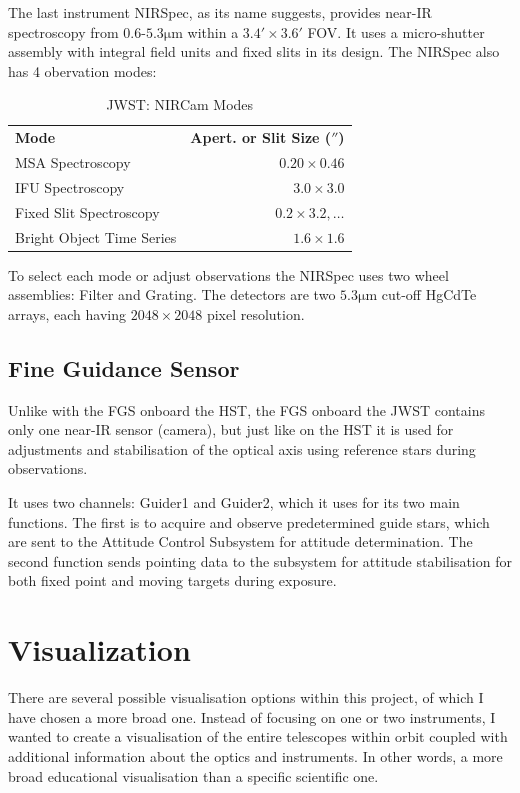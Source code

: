 The last instrument NIRSpec, as its name suggests, provides near-IR spectroscopy from $0.6\text{-}5.3 \unit{\micro\meter}$ within a $3.4' \times 3.6'$ FOV. It uses a micro-shutter assembly with integral field units and fixed slits in its design. The NIRSpec also has 4 obervation modes:

\begin{table}[h]
    \centering
    \begin{tabular}{lr}
        \textbf{Mode} & \textbf{Apert. or Slit Size ($''$)}  \\
        MSA Spectroscopy & $0.20 \times 0.46$ \\
        IFU Spectroscopy & $3.0 \times 3.0$ \\
        Fixed Slit Spectroscopy & $0.2 \times 3.2, \dots$ \\
        Bright Object Time Series   & $1.6 \times 1.6$ \\
    \end{tabular}
    \caption{JWST: NIRCam Modes \cite{JWST_NIRSpec}}
    \label{tab:jwst_ote_information}
\end{table}

To select each mode or adjust observations the NIRSpec uses two wheel assemblies: Filter and Grating. The detectors are two $5.3 \unit{\micro\meter}$ cut-off HgCdTe arrays, each having $2048 \times 2048$ pixel resolution.

\subsection{Fine Guidance Sensor}

Unlike with the FGS onboard the HST, the FGS onboard the JWST contains only one near-IR sensor (camera), but just like on the HST it is used for adjustments and stabilisation of the optical axis using reference stars during observations. 

It uses two channels: Guider1 and Guider2, which it uses for its two main functions. The first is to acquire and observe predetermined guide stars, which are sent to the Attitude Control Subsystem for attitude determination. The second function sends pointing data to the subsystem for attitude stabilisation for both fixed point and moving targets during exposure.

\section{Visualization}

There are several possible visualisation options within this project, of which I have chosen a more broad one. Instead of focusing on one or two instruments, I wanted to create a visualisation of the entire telescopes within orbit coupled with additional information about the optics and instruments. In other words, a more broad educational visualisation than a specific scientific one.

